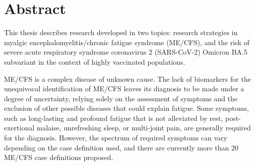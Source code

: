 \section*{Abstract}
This thesis describes research developed in two topics: research strategies in myalgic encephalomyelitis/chronic fatigue syndrome (ME/CFS), and the risk of severe acute respiratory syndrome coronavirus 2 (SARS-CoV-2) Omicron BA.5 subvariant in the context of highly vaccinated populations.

\bsni
ME/CFS is a complex disease of unknown cause. The lack of biomarkers for the unequivocal identification of ME/CFS leaves its diagnosis to be made under a degree of uncertainty, relying solely on the assessment of symptoms and the exclusion of other possible diseases that could explain fatigue. Some symptoms, such as long-lasting and profound fatigue that is not alleviated by rest, post-exertional malaise, unrefreshing sleep, or multi-joint pain, are generally required for the diagnosis. However, the spectrum of required symptoms can vary depending on the case definition used, and there are currently more than 20 ME/CFS case definitions proposed.

